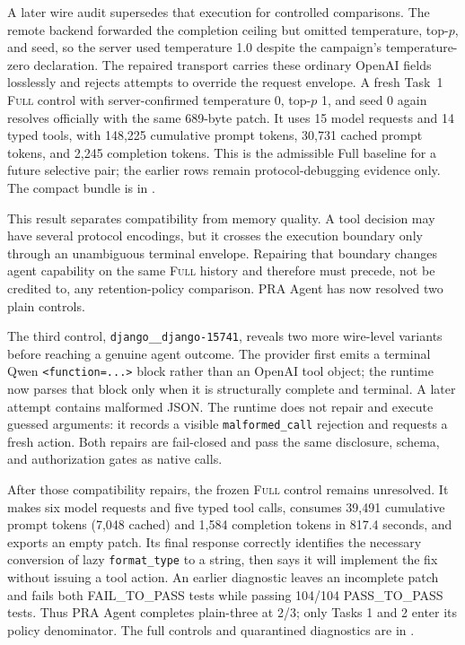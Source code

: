 \documentclass[11pt]{article}
\begin{document}
A later wire audit supersedes that execution for controlled comparisons.  The
remote backend forwarded the completion ceiling but omitted temperature,
top-$p$, and seed, so the server used temperature 1.0 despite the campaign's
temperature-zero declaration.  The repaired transport carries these ordinary
OpenAI fields losslessly and rejects attempts to override the request
envelope.  A fresh Task~1 \textsc{Full} control with server-confirmed
temperature 0, top-$p$ 1, and seed 0 again resolves officially with the same
689-byte patch.  It uses 15 model requests and 14 typed tools, with 148,225
cumulative prompt tokens, 30,731 cached prompt tokens, and 2,245 completion
tokens.  This is the admissible Full baseline for a future selective pair;
the earlier rows remain protocol-debugging evidence only.  The compact bundle
is in .

This result separates compatibility from memory quality.  A tool decision may
have several protocol encodings, but it crosses the execution boundary only
through an unambiguous terminal envelope.  Repairing that boundary changes
agent capability on the same \textsc{Full} history and therefore must precede,
not be credited to, any retention-policy comparison.  PRA Agent has now
resolved two plain controls.

The third control, \texttt{django\_\_django-15741}, reveals two more wire-level
variants before reaching a genuine agent outcome.  The provider first emits a
terminal Qwen \texttt{<function=...>} block rather than an OpenAI tool object;
the runtime now parses that block only when it is structurally complete and
terminal.  A later attempt contains malformed JSON.  The runtime does not
repair and execute guessed arguments: it records a visible
\texttt{malformed\_call} rejection and requests a fresh action.  Both repairs
are fail-closed and pass the same disclosure, schema, and authorization gates
as native calls.

After those compatibility repairs, the frozen \textsc{Full} control remains
unresolved.  It makes six model requests and five typed tool calls, consumes
39,491 cumulative prompt tokens (7,048 cached) and 1,584 completion tokens in
817.4 seconds, and exports an empty patch.  Its final response correctly
identifies the necessary conversion of lazy \texttt{format\_type} to a string,
then says it will implement the fix without issuing a tool action.  An earlier
diagnostic leaves an incomplete patch and fails both FAIL\_TO\_PASS tests while
passing 104/104 PASS\_TO\_PASS tests.  Thus PRA Agent completes plain-three at
2/3; only Tasks 1 and 2 enter its policy denominator.  The full controls and
quarantined diagnostics are in
.
\end{document}

